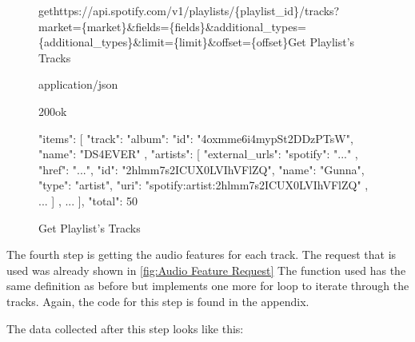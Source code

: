 \begin{figure}[H]
    \caption{Get Playlist's Tracks}
	\label{fig:Get Playlist's Tracks}
\begin{apiRoute}{get}{https://api.spotify.com/v1/playlists/\{playlist\_id\}/tracks?market=\{market\}\&fields=\{fields\}\&additional\_types=\{additional\_types\}\&limit=\{limit\}\&offset=\{offset\}}{Get Playlist's Tracks}
    \begin{routeParameter}
    \end{routeParameter}
    \begin{routeResponse}{application/json}
        \begin{routeResponseItem}{200}{ok}
            \begin{routeResponseItemBody}
{
  "items": [
    {
      "track": {
        "album": {
          "id": "4oxmme6i4mypSt2DDzPTsW",
          "name": "DS4EVER"
        },
        "artists": [
          {
            "external_urls": {
                "spotify": "..."
            },
            "href": "...",
            "id": "2hlmm7s2ICUX0LVIhVFlZQ",
            "name": "Gunna",
            "type": "artist",
            "uri": "spotify:artist:2hlmm7s2ICUX0LVIhVFlZQ"
          },
          ...
        ]
      }
    },
    ...
  ],
  "total": 50
}
            \end{routeResponseItemBody}
        \end{routeResponseItem}
    \end{routeResponse}
\end{apiRoute}
\end{figure}

The fourth step is getting the audio features for each track.
The request that is used was already shown in \ref{fig:Audio Feature Request}
The function used has the same definition as before but implements one more for loop to iterate through
the tracks. Again, the code for this step is found in the appendix.

The data collected after this step looks like this:

